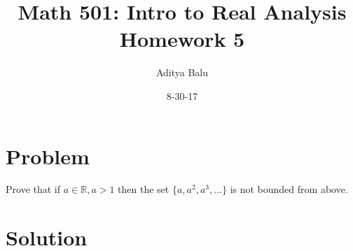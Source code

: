 \documentclass[]{article}
\title{Math 501: Intro to Real Analysis\\Homework 5}
\date{8-30-17}
\author{Aditya Balu}
\begin{document}
\maketitle

\section*{Problem}
Prove that if $a \in \mathbb{R}, a>1$ then the set $\{a, a^2, a^3,...\}$ is not bounded from above.

\section*{Solution}
\end{document}
